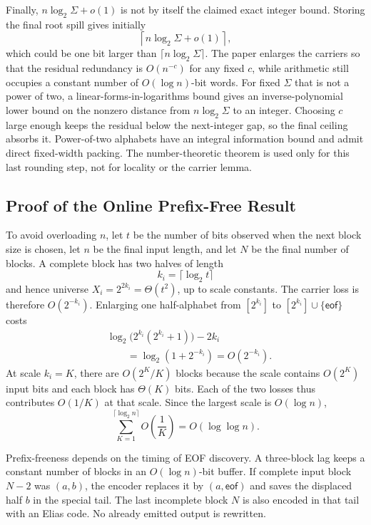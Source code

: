 Finally, \(n\log_2\Sigma+o(1)\) is not by itself the claimed exact integer
bound.  Storing the final root spill gives initially
\[
    \left\lceil n\log_2\Sigma+o(1)\right\rceil,
\]
which could be one bit larger than \(\lceil n\log_2\Sigma\rceil\).  The paper
enlarges the carriers so that the residual redundancy is \(O(n^{-c})\) for
any fixed \(c\), while arithmetic still occupies a constant number of
\(O(\log n)\)-bit words.  For fixed \(\Sigma\) that is not a power of two, a
linear-forms-in-logarithms bound gives an inverse-polynomial lower bound on
the nonzero distance from \(n\log_2\Sigma\) to an integer.  Choosing \(c\)
large enough keeps the residual below the next-integer gap, so the final
ceiling absorbs it.  Power-of-two alphabets have an integral information
bound and admit direct fixed-width packing.  The number-theoretic theorem is
used only for this last rounding step, not for locality or the carrier lemma.

\subsection{Proof of the Online Prefix-Free Result}

To avoid overloading \(n\), let \(t\) be the number of bits observed when the
next block size is chosen, let \(n\) be the final input length, and let \(N\)
be the final number of blocks.  A complete block has two halves of length
\[
    k_i=\lceil\log_2t\rceil
\]
and hence universe \(X_i=2^{2k_i}=\Theta(t^2)\), up to scale constants.  The
carrier loss is therefore \(O(2^{-k_i})\).  Enlarging one half-alphabet from
\([2^{k_i}]\) to \([2^{k_i}]\cup\{\mathsf{eof}\}\) costs
\[
\begin{aligned}
 &\log_2\bigl(2^{k_i}(2^{k_i}+1)\bigr)-2k_i\\
 &\qquad=\log_2(1+2^{-k_i})=O(2^{-k_i}).
\end{aligned}
\]
At scale \(k_i=K\), there are \(O(2^K/K)\) blocks because the scale contains
\(O(2^K)\) input bits and each block has \(\Theta(K)\) bits.  Each of the two
losses thus contributes \(O(1/K)\) at that scale.  Since the largest scale is
\(O(\log n)\),
\[
    \sum_{K=1}^{\lceil\log_2n\rceil}O\left(\frac{1}{K}\right)
    =O(\log\log n).
\]

Prefix-freeness depends on the timing of EOF discovery.  A three-block lag
keeps a constant number of blocks in an \(O(\log n)\)-bit buffer.  If complete
input block \(N-2\) was \((a,b)\), the encoder replaces it by
\((a,\mathsf{eof})\) and saves the displaced half \(b\) in the special tail.
The last incomplete block \(N\) is also encoded in that tail with an Elias
code.  No already emitted output is rewritten.

